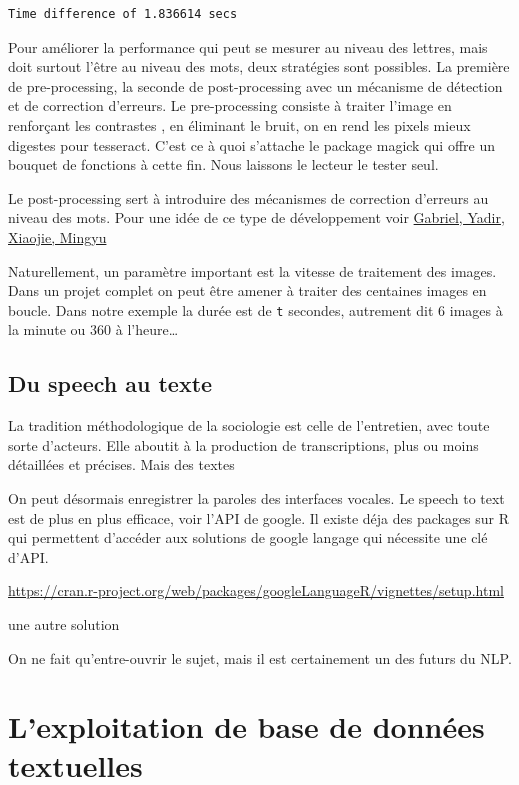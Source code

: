 \documentclass[
  letterpaper,
  DIV=11,
  numbers=noendperiod]{scrreprt}
\begin{document}
\begin{verbatim}
Time difference of 1.836614 secs
\end{verbatim}

Pour améliorer la performance qui peut se mesurer au niveau des lettres,
mais doit surtout l'être au niveau des mots, deux stratégies sont
possibles. La première de pre-processing, la seconde de post-processing
avec un mécanisme de détection et de correction d'erreurs. Le
pre-processing consiste à traiter l'image en renforçant les contrastes ,
en éliminant le bruit, on en rend les pixels mieux digestes pour
tesseract. C'est ce à quoi s'attache le package magick qui offre un
bouquet de fonctions à cette fin. Nous laissons le lecteur le tester
seul.

Le post-processing sert à introduire des mécanismes de correction
d'erreurs au niveau des mots. Pour une idée de ce type de développement
voir \href{https://gabriben.github.io/NLP.html}{Gabriel, Yadir, Xiaojie,
Mingyu}

Naturellement, un paramètre important est la vitesse de traitement des
images. Dans un projet complet on peut être amener à traiter des
centaines images en boucle. Dans notre exemple la durée est de
\texttt{t} secondes, autrement dit 6 images à la minute ou 360 à
l'heure\ldots{}

\subsection{Du speech au texte}\label{du-speech-au-texte}

La tradition méthodologique de la sociologie est celle de l'entretien,
avec toute sorte d'acteurs. Elle aboutit à la production de
transcriptions, plus ou moins détaillées et précises. Mais des textes

On peut désormais enregistrer la paroles des interfaces vocales. Le
speech to text est de plus en plus efficace, voir l'API de google. Il
existe déja des packages sur R qui permettent d'accéder aux solutions de
google langage qui nécessite une clé d'API.

\url{https://cran.r-project.org/web/packages/googleLanguageR/vignettes/setup.html}

une autre solution

On ne fait qu'entre-ouvrir le sujet, mais il est certainement un des
futurs du NLP.

\section{L'exploitation de base de données
textuelles}\label{lexploitation-de-base-de-donnuxe9es-textuelles}
\end{document}
